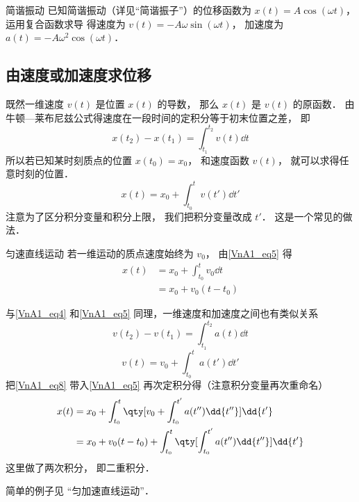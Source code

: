 \begin{example}{简谐振动}
已知简谐振动（详见“简谐振子”）的位移函数为 $x(t) = A\cos(\omega t)$， 运用复合函数求导 得速度为 $v(t) = -A\omega\sin(\omega t)$， 加速度为 $a(t) = -A\omega^2\cos(\omega t)$．
\end{example}

\subsection{由速度或加速度求位移}
既然一维速度 $v(t)$ 是位置 $x(t)$ 的导数， 那么 $x(t)$ 是 $v(t)$ 的原函数． 由牛顿—莱布尼兹公式得速度在一段时间的定积分等于初末位置之差， 即
\begin{equation}\label{VnA1_eq4}
x(t_2) - x(t_1) = \int_{t_1}^{t_2} v(t) \dd{t}
\end{equation}
所以若已知某时刻质点的位置 $x(t_0) = x_0$， 和速度函数 $v(t)$， 就可以求得任意时刻的位置．
\begin{equation}\label{VnA1_eq5}
x(t) = x_0 + \int_{t_0}^t v(t') \dd{t'}
\end{equation}
注意为了区分积分变量和积分上限， 我们把积分变量改成 $t'$． 这是一个常见的做法．

\begin{example}{匀速直线运动}
若一维运动的质点速度始终为 $v_0$， 由\autoref{VnA1_eq5} 得
\begin{equation}
\begin{aligned}
x(t) &= x_0 + \int_{t_0}^t v_0 \dd{t}\\
&= x_0 + v_0(t-t_0)
\end{aligned}
\end{equation}
\end{example}

与\autoref{VnA1_eq4} 和\autoref{VnA1_eq5} 同理，一维速度和加速度之间也有类似关系
\begin{equation}
v(t_2) - v(t_1) = \int_{t_1}^{t_2} a(t) \dd{t}
\end{equation}
\begin{equation}\label{VnA1_eq8}
v(t) = v_0 + \int_{t_0}^t a(t') \dd{t'}
\end{equation}
把\autoref{VnA1_eq8} 带入\autoref{VnA1_eq5} 再次定积分得（注意积分变量再次重命名）
\begin{equation}
\begin{aligned}
x(t) &= x_0 + \int_{t_0}^t  \qty[v_0 + \int_{t_0}^{t'} a(t'') \dd{t''}] \dd{t'}\\
&= x_0 + v_0 (t - t_0) + \int_{t_0}^t \qty[\int_{t_0}^{t'} a(t'') \dd{t''}] \dd{t'}\\
\end{aligned}
\end{equation}
这里做了两次积分， 即二重积分．

简单的例子见 “匀加速直线运动”．
